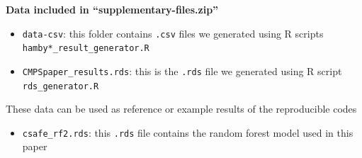 \textbf{Data included in ``supplementary-files.zip''}

\begin{itemize}
\tightlist
\item
  \texttt{data-csv}: this folder contains \texttt{.csv} files we
  generated using R scripts \texttt{hamby*\_result\_generator.R}
\item
  \texttt{CMPSpaper\_results.rds}: this is the \texttt{.rds} file we
  generated using R script \texttt{rds\_generator.R}
\end{itemize}

These data can be used as reference or example results of the
reproducible codes

\begin{itemize}
\tightlist
\item
  \texttt{csafe\_rf2.rds}: this \texttt{.rds} file contains the random
  forest model used in this paper
\end{itemize}



\address{%
Wangqian Ju\\
Department of Statistics\\%
Center for Statistics and Applications in Forensic Evidence\\ Iowa State
University\\ 2438 Osborn Dr\\ Ames, IA 50011\\
%
\url{https://github.com/willju-wangqian}\\%
\textit{ORCiD: \href{https://orcid.org/0000-0002-9977-377X}{0000-0002-9977-377X}}\\%
\href{mailto:wju@iastate.edu}{\nolinkurl{wju@iastate.edu}}%
}

\address{%
Heike Hofmann\\
Department of Statistics\\%
Center for Statistics and Applications in Forensic Evidence\\ Iowa State
University\\ 2438 Osborn Dr\\ Ames, IA 50011\\
%
\url{https://github.com/heike}\\%
\textit{ORCiD: \href{https://orcid.org/0000-0002-9079-593X}{0000-0002-9079-593X}}\\%
\href{mailto:hofmann@iastate.edu}{\nolinkurl{hofmann@iastate.edu}}%
}
